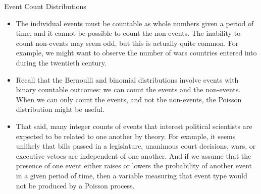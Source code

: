 \documentclass[
  ignorenonframetext,
]{beamer}
\begin{document}
\begin{frame}{Event Count Distributions}
\protect\hypertarget{event-count-distributions-1}{}

\begin{itemize}
\item
  The individual events must be countable as whole numbers given a
  period of time, and it cannot be possible to count the non-events. The
  inability to count non-events may seem odd, but this is actually quite
  common. For example, we might want to observe the number of wars
  countries entered into during the twentieth century.
\item
  Recall that the Bernoulli and binomial distributions involve events
  with binary countable outcomes: we can count the events and the
  non-events. When we can only count the events, and not the non-events,
  the Poisson distribution might be useful.
\item
  That said, many integer counts of events that interest political
  scientists are expected to be related to one another by theory. For
  example, it seems unlikely that bills passed in a legislature,
  unanimous court decisions, wars, or executive vetoes are independent
  of one another. And if we assume that the presence of one event either
  raises or lowers the probability of another event in a given period of
  time, then a variable measuring that event type would not be produced
  by a Poisson process.
\end{itemize}

\end{frame}
\end{document}
